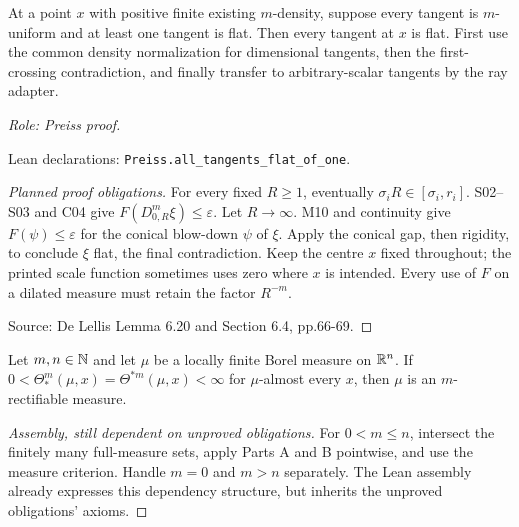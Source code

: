 \begin{theorem}
\label{thm:part-b}







At a point $x$ with positive finite existing $m$-density, suppose every tangent is $m$-uniform and at least one tangent is flat. Then every tangent at $x$ is flat. First use the common density normalization for dimensional tangents, then the first-crossing contradiction, and finally transfer to arbitrary-scalar tangents by the ray adapter.
\par\emph{Role: Preiss proof.}
\par Lean declarations: \texttt{Preiss.all\_tangents\_flat\_of\_one}.
\end{theorem}
\begin{proof}[Planned proof obligations]

For every fixed $R\geq1$, eventually $\sigma_i R\in[\sigma_i,r_i]$.
S02--S03 and C04 give $F(D^m_{0,R}\xi)\leq\varepsilon$.
Let $R\to\infty$. M10 and continuity give $F(\psi)\leq\varepsilon$ for
the conical blow-down $\psi$ of $\xi$. Apply the conical gap, then rigidity,
to conclude $\xi$ flat, the final contradiction.
Keep the centre $x$ fixed throughout; the printed scale function sometimes
uses zero where $x$ is intended. Every use of $F$ on a dilated measure must
retain the factor $R^{-m}$.
\par Source: De Lellis Lemma 6.20 and Section 6.4, pp.66-69.
\end{proof}

\begin{theorem}[Preiss]
\label{thm:preiss}










Let $m,n\in\mathbb N$ and let $\mu$ be a locally finite Borel measure on $\mathbb R^n$.
If $0<\Theta_*^m(\mu,x)=\Theta^{*m}(\mu,x)<\infty$ for
$\mu$-almost every $x$, then $\mu$ is an $m$-rectifiable measure.
\end{theorem}
\begin{proof}[Assembly, still dependent on unproved obligations]

For $0<m\leq n$, intersect the finitely many full-measure sets, apply
Parts A and B pointwise, and use the measure criterion. Handle $m=0$ and
$m>n$ separately. The Lean assembly already expresses this dependency
structure, but inherits the unproved obligations' axioms.
\end{proof}

